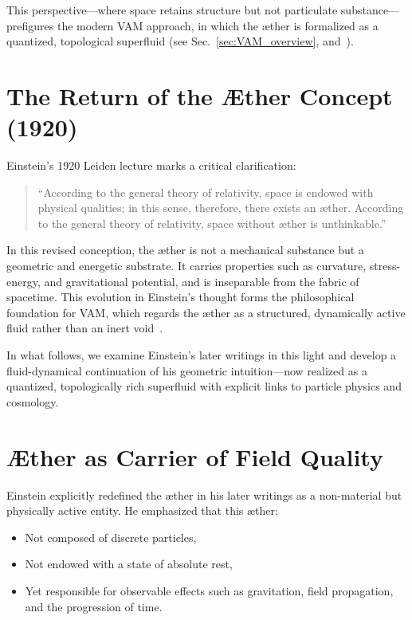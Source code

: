 \documentclass[preprint,notitlepage]{revtex4-2}
\begin{document}
This perspective—where space retains structure but not particulate substance—prefigures the modern VAM approach, in which the æther is formalized as a quantized, topological superfluid (see Sec.~\ref{sec:VAM_overview}, and~\cite{VAM-8}).

\section{The Return of the Æther Concept (1920)}

Einstein’s 1920 Leiden lecture marks a critical clarification:
\begin{quote}
    ``According to the general theory of relativity, space is endowed with physical qualities; in this sense, therefore, there exists an æther. According to the general theory of relativity, space without æther is unthinkable.''~\cite{einstein1920aether}
\end{quote}

In this revised conception, the æther is not a mechanical substance but a geometric and energetic substrate. It carries properties such as curvature, stress-energy, and gravitational potential, and is inseparable from the fabric of spacetime. This evolution in Einstein’s thought forms the philosophical foundation for VAM, which regards the æther as a structured, dynamically active fluid rather than an inert void~\cite{VAM-8}.

In what follows, we examine Einstein’s later writings in this light and develop a fluid-dynamical continuation of his geometric intuition—now realized as a quantized, topologically rich superfluid with explicit links to particle physics and cosmology.

\section{Æther as Carrier of Field Quality}

Einstein explicitly redefined the æther in his later writings as a non-material but physically active entity. He emphasized that this æther:
\begin{itemize}
    \item Not composed of discrete particles,
    \item Not endowed with a state of absolute rest,
    \item Yet responsible for observable effects such as gravitation, field propagation, and the progression of time.
\end{itemize}
\end{document}
